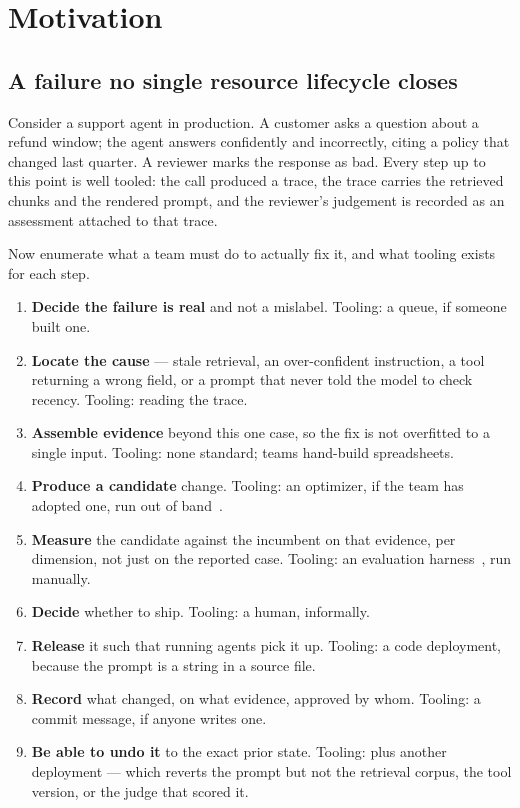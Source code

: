 \section{Motivation}
\label{sec:motivation}

\subsection{A failure no single resource lifecycle closes}

Consider a support agent in production. A customer asks a question about a refund
window; the agent answers confidently and incorrectly, citing a policy that
changed last quarter. A reviewer marks the response as bad. Every step up to this
point is well tooled: the call produced a trace, the trace carries the retrieved
chunks and the rendered prompt, and the reviewer's judgement is recorded as an
assessment attached to that trace.

Now enumerate what a team must do to actually fix it, and what tooling exists for
each step.

\begin{enumerate}[leftmargin=1.5em]
\item \textbf{Decide the failure is real} and not a mislabel. Tooling: a queue, if
someone built one.
\item \textbf{Locate the cause} --- stale retrieval, an over-confident
instruction, a tool returning a wrong field, or a prompt that never told the model
to check recency. Tooling: reading the trace.
\item \textbf{Assemble evidence} beyond this one case, so the fix is not
overfitted to a single input. Tooling: none standard; teams hand-build spreadsheets.
\item \textbf{Produce a candidate} change. Tooling: an optimizer, if the team has
adopted one, run out of band~\cite{khattab2024dspy,yang2024opro}.
\item \textbf{Measure} the candidate against the incumbent on that evidence, per
dimension, not just on the reported case. Tooling: an evaluation
harness~\cite{promptfoo,openaievals}, run manually.
\item \textbf{Decide} whether to ship. Tooling: a human, informally.
\item \textbf{Release} it such that running agents pick it up. Tooling: a code
deployment, because the prompt is a string in a source file.
\item \textbf{Record} what changed, on what evidence, approved by whom. Tooling:
a commit message, if anyone writes one.
\item \textbf{Be able to undo it} to the exact prior state. Tooling:  plus another deployment --- which reverts the prompt but not the
retrieval corpus, the tool version, or the judge that scored it.
\end{enumerate}

